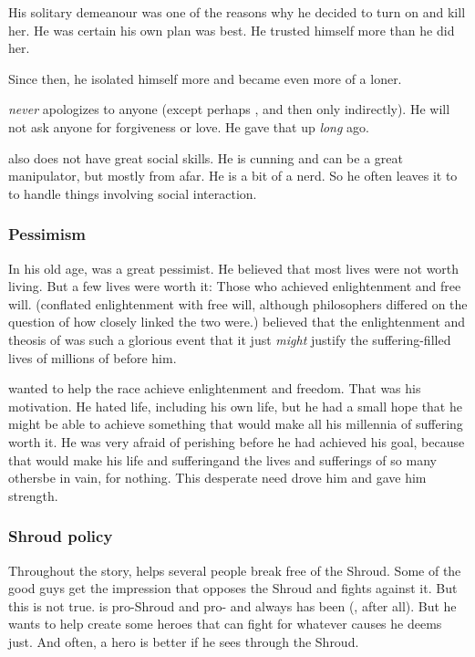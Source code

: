His solitary demeanour was one of the reasons why he decided to turn on \Triestessakhin{} and kill her. 
He was certain his own plan was best. 
He trusted himself more than he did her. 

Since then, he isolated himself more and became even more of a loner. 

\Ishnaruchaefir{} \emph{never} apologizes to anyone (except perhaps \Criseis, and then only indirectly). 
He will not ask anyone for forgiveness or love.
He gave that up \emph{long} ago. 

\Ishnaruchaefir{} also does not have great social skills. 
He is cunning and can be a great manipulator, but mostly from afar. 
He is a bit of a nerd. 
So he often leaves it to \Criseis{} to handle things involving social interaction. 





\subsubsection{Pessimism}
In his old age, \Iscrafel was a great pessimist. 
He believed that most lives were not worth living. 
But a few lives were worth it: 
Those who achieved enlightenment and free will. 
(\Iscrafel conflated enlightenment with free will, although philosophers differed on the question of how closely linked the two were.) 
\Iscrafel believed that the enlightenment and theosis of \Sethicus was such a glorious event that it just \emph{might} justify the suffering-filled lives of millions of \caisith before him. 

\Iscrafel wanted to help the \draconic race achieve enlightenment and freedom. 
That was his motivation. 
He hated life, including his own life, but he had a small hope that he might be able to achieve something that would make all his millennia of suffering worth it. 
He was very afraid of perishing before he had achieved his goal, because that would make his life and suffering\dash and the lives and sufferings of so many others\dash be in vain, for nothing. 
This desperate need drove him and gave him strength. 





\subsubsection{Shroud policy}
Throughout the story, \Ishnaruchaefir{} helps several people break free of the Shroud. 
Some of the good guys get the impression that \Ishnaruchaefir{} opposes the Shroud and fights against it. 
But this is not true. 
\Ishnaruchaefir{} is pro-Shroud and pro- and always has been (, after all). 
But he wants to help create some heroes that can fight for whatever causes he deems just. 
And often, a hero is better if he sees through the Shroud. 





